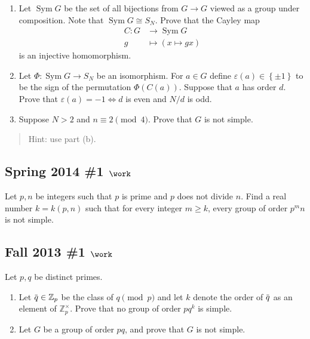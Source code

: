 \begin{enumerate}
\def\labelenumi{\alph{enumi}.}
\item
  Let \(\operatorname{Sym}G\) be the set of all bijections from
  \(G\to G\) viewed as a group under composition. Note that
  \(\operatorname{Sym}G \cong S_N\). Prove that the Cayley map
  \begin{align*}
  C: G&\to \operatorname{Sym}G\\
  g &\mapsto (x\mapsto gx)
  \end{align*}
  is an injective homomorphism.
\item
  Let \(\Phi: \operatorname{Sym}G\to S_N\) be an isomorphism. For
  \(a\in G\) define \(\varepsilon(a) \in \left\{{\pm 1}\right\}\) to be
  the sign of the permutation \(\Phi(C(a))\). Suppose that \(a\) has
  order \(d\). Prove that \(\varepsilon(a) = -1 \iff d\) is even and
  \(N/d\) is odd.
\item
  Suppose \(N> 2\) and \(n\equiv 2 \pmod 4\). Prove that \(G\) is not
  simple.
\end{enumerate}

\begin{quote}
Hint: use part (b).
\end{quote}

\hypertarget{spring-2014-1-work}{%
\subsection{\texorpdfstring{Spring 2014 \#1
\(\work\)}{Spring 2014 \#1 \textbackslash work}}\label{spring-2014-1-work}}

Let \(p, n\) be integers such that \(p\) is prime and \(p\) does not
divide \(n\). Find a real number \(k = k (p, n)\) such that for every
integer \(m\geq k\), every group of order \(p^m n\) is not simple.

\hypertarget{fall-2013-1-work}{%
\subsection{\texorpdfstring{Fall 2013 \#1
\(\work\)}{Fall 2013 \#1 \textbackslash work}}\label{fall-2013-1-work}}

Let \(p, q\) be distinct primes.

\begin{enumerate}
\def\labelenumi{\alph{enumi}.}
\item
  Let
  \(\mkern 1.5mu\overline{\mkern-1.5muq\mkern-1.5mu}\mkern 1.5mu \in {\mathbb{Z}}_p\)
  be the class of \(q\pmod p\) and let \(k\) denote the order of
  \(\mkern 1.5mu\overline{\mkern-1.5muq\mkern-1.5mu}\mkern 1.5mu\) as an
  element of \({\mathbb{Z}}_p^{\times}\). Prove that no group of order
  \(pq^k\) is simple.
\item
  Let \(G\) be a group of order \(pq\), and prove that \(G\) is not
  simple.
\end{enumerate}

